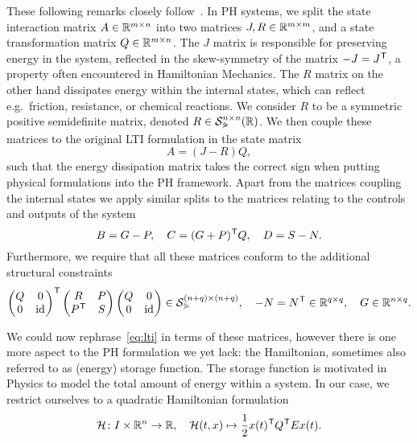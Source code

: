 These following remarks closely follow~\cite[Definition~4.9]{Mehrmann2022}.
In \ac{PH} systems, we split the state interaction matrix $A \in \mathbb{R}^{m \times n}$ into two matrices $J, R \in \mathbb{R}^{m \times m}$, and a state transformation matrix $Q \in \mathbb{R}^{m \times n}$.
The $J$ matrix is responsible for preserving energy in the system, reflected in the skew-symmetry of the matrix $-J = J^{\mkern1mu \mathsf{T}}$, a property often encountered in Hamiltonian Mechanics.
The $R$ matrix on the other hand dissipates energy within the internal states, which can reflect e.g.\ friction, resistance, or chemical reactions.
We consider $R$ to be a symmetric positive semidefinite matrix, denoted $R \in \mathcal{S}_{\curlyeqsucc}^{n \times n}(\mathbb{R})$.
We then couple these matrices to the original \ac{LTI} formulation in the state matrix
\begin{equation*}
    A = (J - R)Q,
\end{equation*}
such that the energy dissipation matrix takes the correct sign when putting physical formulations into the \ac{PH} framework.
Apart from the matrices coupling the internal states we apply similar splits to the matrices relating to the controls and outputs of the system
\begin{equation*}
    B = G - P,\quad C = (G + P)^{\mkern1mu \mathsf{T}} Q,\quad D = S - N.
\end{equation*}
Furthermore, we require that all these matrices conform to the additional structural constraints
\begin{equation*}
    \begin{pmatrix}
        Q & 0 \\
        0 & \text{id}_{}
    \end{pmatrix}^{\mkern1mu \mathsf{T}}
    \begin{pmatrix}
        R & P \\
        P^{\mkern1mu \mathsf{T}} & S
    \end{pmatrix}
    \begin{pmatrix}
        Q & 0 \\
        0 & \text{id}_{}
    \end{pmatrix}
    \in \mathcal{S}_{\curlyeqsucc}^{(n + q) \times (n + q)},\quad -N = N^{\mkern1mu \mathsf{T}} \in \mathbb{R}^{q \times q},\quad G \in \mathbb{R}^{n \times q}.
\end{equation*}

We could now rephrase~\eqref{eq:lti} in terms of these matrices, however there is one more aspect to the \ac{PH} formulation we yet lack: the Hamiltonian, sometimes also referred to as (energy) storage function.
The storage function is motivated in Physics to model the total amount of energy within a system.
In our case, we restrict ourselves to a quadratic Hamiltonian formulation
\begin{equation}\label{eq:quadratic-hamiltonian}
    \mathcal{H} \colon I \times \mathbb{R}^{n} \to \mathbb{R},\quad \mathcal{H}(t, x) \mapsto \frac{1}{2} x(t)^{\mkern1mu \mathsf{T}} Q^{\mkern1mu \mathsf{T}} E x(t).
\end{equation}

